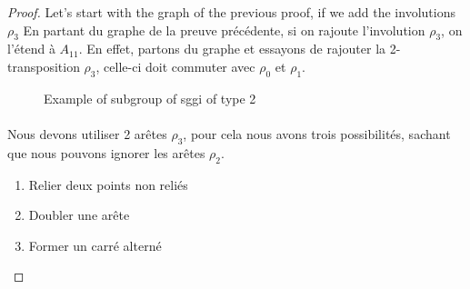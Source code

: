 \begin{proof}
  Let's start with the graph of the previous proof, if we add the involutions $\rho_3$
  En partant du graphe de la preuve précédente, si on rajoute l'involution $\rho_3$, on l'étend à $A_{11}$.
  En effet, partons du graphe et essayons de rajouter la 2-transposition $\rho_3$, celle-ci doit commuter avec $\rho_0$ et $\rho_1$.
  \begin{figure}[H]
    \begin{center}
      \caption{Example of subgroup of sggi of type 2}
    \end{center}
  \end{figure}

  \paragraph{}
  Nous devons utiliser 2 arêtes $\rho_3$, pour cela nous avons trois possibilités, sachant que nous pouvons ignorer les arêtes $\rho_2$.
  \begin{enumerate}
    \item Relier deux points non reliés
    \item Doubler une arête
    \item Former un carré alterné
  \end{enumerate}


\end{proof}
